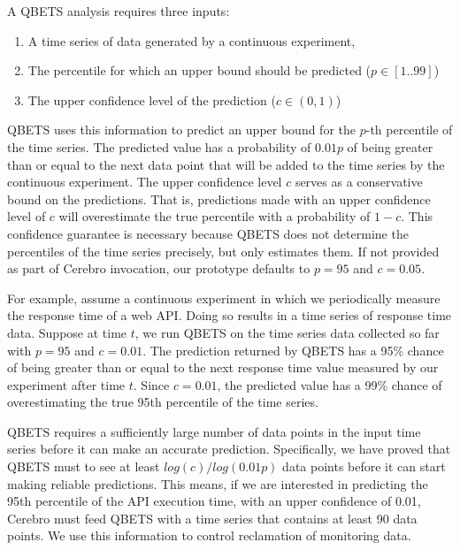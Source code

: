 A QBETS analysis requires three inputs:
\begin{enumerate}
\item A time series of data generated by a continuous experiment,
\item The percentile for which an upper bound should be predicted ($p \in [1..99]$)
\item The upper confidence level of the prediction ($c \in (0,1)$)
\end{enumerate}

QBETS uses this information to predict an upper bound for 
the $p$-th percentile of the time series.
The predicted value has a probability of $0.01p$ of 
being greater than or equal to the next data point that
will be added to the time series by the continuous experiment. 
The upper confidence level $c$ serves as a conservative
bound on the predictions. That is, predictions made with an upper confidence 
level of $c$ will overestimate
the true percentile with a probability of $1-c$. This confidence guarantee 
is necessary because QBETS does not determine the 
percentiles of the time series precisely, but only estimates them. 
If not provided as part of Cerebro invocation, our prototype 
defaults to $p=95$ and $c=0.05$. 

For example, assume a continuous experiment 
in which we periodically measure the
response time of a web API. Doing so results in a time series of 
response time data. Suppose at time $t$,
we run QBETS on the time series data collected so far 
with $p=95$ and $c=0.01$. The prediction returned
by QBETS has a 95\% chance of being greater than or equal 
to the next response time value measured
by our experiment after time $t$. Since $c=0.01$, the predicted value has a 99\% chance of
overestimating the true 95th percentile of the time series.

QBETS requires a sufficiently large number of data points
in the input time series before it can make an accurate prediction. 
Specifically, we have proved that QBETS must to see 
at least $log(c)/log(0.01p)$ data points
before it can start making reliable predictions. 
This means, if we are interested in predicting the 95th percentile
of the API execution time, with an upper confidence of 0.01, 
Cerebro must feed QBETS with a time series that
contains at least 90 data points. We use this information to control 
reclamation of monitoring data.


